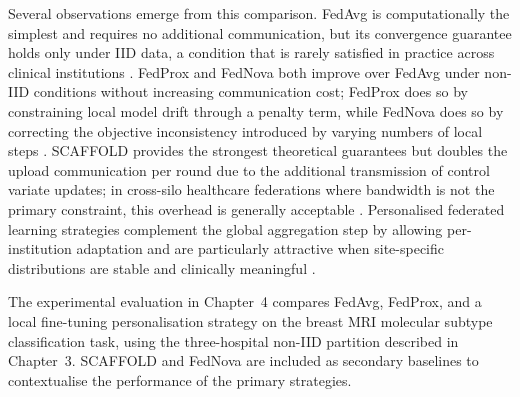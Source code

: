 Several observations emerge from this comparison.
FedAvg is computationally the simplest and requires no additional
communication, but its convergence guarantee holds only under IID
data, a condition that is rarely satisfied in practice across
clinical institutions \cite{mcmahan2017communication,arbaoui2025survey}.
FedProx and FedNova both improve over FedAvg under non-IID
conditions without increasing communication cost; FedProx does so
by constraining local model drift through a penalty term, while
FedNova does so by correcting the objective inconsistency introduced
by varying numbers of local steps \cite{li2020fedprox,li2020fednova}.
SCAFFOLD provides the strongest theoretical guarantees but doubles
the upload communication per round due to the additional transmission
of control variate updates; in cross-silo healthcare federations
where bandwidth is not the primary constraint, this overhead is
generally acceptable \cite{karimireddy2020scaffold,kairouz2021advances}.
Personalised federated learning strategies complement the global
aggregation step by allowing per-institution adaptation and are
particularly attractive when site-specific distributions are
stable and clinically meaningful \cite{ghosh2020clustered}.

The experimental evaluation in Chapter~4 compares FedAvg, FedProx,
and a local fine-tuning personalisation strategy on the breast MRI
molecular subtype classification task, using the three-hospital
non-IID partition described in Chapter~3.
SCAFFOLD and FedNova are included as secondary baselines to
contextualise the performance of the primary strategies.

